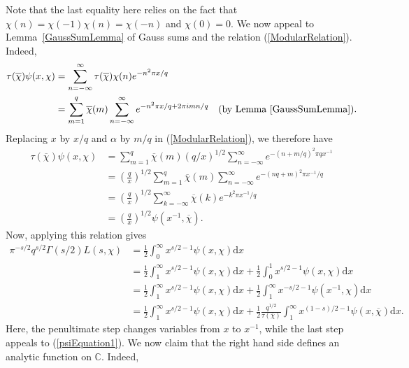 Note that the last equality here relies on the fact that $\chi(n) = \chi(-1)\chi(n) = \chi(-n)$ and $\chi(0) = 0$. We now appeal to Lemma~\ref{GaussSumLemma} of Gauss sums and the relation (\ref{ModularRelation}). Indeed,
\begin{align}
    \tau(\overline{\chi}) \psi(x, \chi) &= \sum_{n=-\infty}^{\infty} \tau(\overline{\chi}) \chi(n) e^{-n^2 \pi x / q} \nonumber \\
    &= \sum_{m=1}^{q} \overline{\chi}(m) \sum_{n=-\infty}^{\infty} e^{-n^{2} \pi x/q + 2\pi i m n / q} \quad (\textrm{by Lemma~\ref{GaussSumLemma}}). \nonumber
\end{align}
Replacing $x$ by $x/q$ and $\alpha$ by $m/q$ in (\ref{ModularRelation}), we therefore have
\begin{align}
\label{psiEquation1}
    \tau(\overline{\chi}) \psi(x, \chi) &= \sum_{m=1}^{q} \overline{\chi}(m) (q/x)^{1/2}\sum_{n=-\infty}^{\infty} e^{-(n + m/q)^{2}\pi q x^{-1}} \nonumber \\
    &= \left(\frac{q}{x}\right)^{1/2} \sum_{m=1}^{q}\overline{\chi}(m) \sum_{n=-\infty}^{\infty}e^{-(nq + m)^{2}\pi x^{-1}/ q} \nonumber \\
    &= \left(\frac{q}{x}\right)^{1/2} \sum_{k=-\infty}^{\infty} \overline{\chi}(k) e^{-k^{2} \pi x^{-1}/q} \nonumber \\
    &= \left(\frac{q}{x}\right)^{1/2} \psi(x^{-1}, \overline{\chi}).
\end{align}
Now, applying this relation gives
\begin{align}
\label{FirstIntegralEquation}
    \pi^{-s/2}q^{s/2}\Gamma(s/2)L(s, \chi) &= \frac12 \int_{0}^{\infty} x^{s/2 - 1} \psi(x, \chi)\mathrm{d} x \nonumber \\
    &= \frac12 \int_{1}^{\infty} x^{s/2 - 1} \psi(x, \chi)\mathrm{d} x + \frac12 \int_{0}^{1} x^{s/2 - 1} \psi(x, \chi)\mathrm{d} x \nonumber \\
    &= \frac12 \int_{1}^{\infty} x^{s/2 - 1} \psi(x, \chi)\mathrm{d} x + \frac12 \int_{1}^{\infty} x^{-s/2 - 1} \psi(x^{-1}, \chi)\mathrm{d} x \nonumber \\
    &= \frac12 \int_{1}^{\infty} x^{s/2 - 1} \psi(x, \chi)\mathrm{d} x + \frac12\frac{q^{1/2}}{\tau(\overline{\chi})} \int_{1}^{\infty} x^{(1-s)/2 - 1} \psi(x, \overline{\chi})\mathrm{d} x.
\end{align}
Here, the penultimate step changes variables from $x$ to $x^{-1}$, while the last step appeals to (\ref{psiEquation1}). We now claim that the right hand side defines an analytic function on $\mathbb{C}$.  Indeed, 
